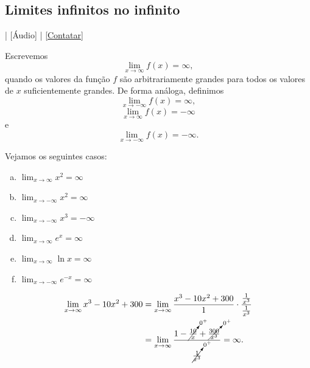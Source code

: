 \subsection{Limites infinitos no infinito}

\begin{flushright}
  [Vídeo] | [Áudio] | \href{https://phkonzen.github.io/notas/contato.html}{[Contatar]}
\end{flushright}

Escrevemos
\begin{equation}
  \lim_{x\to\infty} f(x)=\infty,
\end{equation}
quando os valores da função $f$ são arbitrariamente grandes para todos os valores de $x$ suficientemente grandes. De forma análoga, definimos
\begin{equation}
  \lim_{x\to -\infty} f(x)=\infty,
\end{equation}
\begin{equation}
  \lim_{x\to \infty} f(x)=-\infty
\end{equation}
e
\begin{equation}
  \lim_{x\to -\infty} f(x)=-\infty.
\end{equation}

\begin{ex}
  Vejamos os seguintes casos:
  \begin{enumerate}[a)]
  \item $\displaystyle\lim_{x\to\infty} x^2 = \infty$
  \item $\displaystyle\lim_{x\to -\infty} x^2 = \infty$
  \item $\displaystyle\lim_{x\to -\infty} x^3 = -\infty$
  \item $\displaystyle\lim_{x\to \infty} e^x = \infty$
  \item $\displaystyle\lim_{x\to \infty} \ln x = \infty$
  \item $\displaystyle\lim_{x\to -\infty} e^{-x} = \infty$
  \end{enumerate}
\end{ex}

\begin{ex}\label{ex:liminf_poli}
  \begin{align}
    \lim_{x\to \infty} x^3 - 10x^2 + 300 &= \lim_{x\to \infty} \frac{x^3 - 10x^2 + 300}{1}\cdot\frac{\frac{1}{x^3}}{\frac{1}{x^3}}\\
                                         &= \lim_{x\to \infty} \frac{1 - \cancelto{0^+}{\frac{10}{x}} + \cancelto{0^+}{\frac{300}{x^3}}}{\cancelto{0^+}{\frac{1}{x^3}}} = \infty.                                   
  \end{align}
\end{ex}

